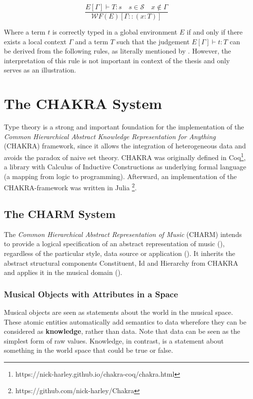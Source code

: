 \begin{equation}
\frac{E[\Gamma] \vdash T: s \quad s \in \mathcal{S} \quad x \notin \Gamma}{\mathcal{W} F(E)[\Gamma::(x: T)]}
\end{equation}



Where a term $t$ is correctly typed in a global environment $E$ if and only if there exists a local context $\Gamma$ and a term $T$ such that the judgement  $E[\Gamma] \vdash t:T$ can be derived from the following rules, as literally mentioned by \textcite{inria_calculus_2018}. However, the interpretation of this rule is not important in context of the thesis and only serves as an illustration.

 
\section{The CHAKRA System}

Type theory is a strong and important foundation for the implementation of the \textit{Common Hierarchical Abstract Knowledge Representation for Anything} (CHAKRA) framework, since it allows the integration of heterogeneous data and avoids the paradox of naive set theory. CHAKRA was originally defined in Coq\footnote{https://nick-harley.github.io/chakra-coq/chakra.html}, a library with Calculus of Inductive Constructions as underlying formal language (a mapping from logic to programming). Afterward, an implementation of the CHAKRA-framework was written in Julia \footnote{https://github.com/nick-harley/Chakra}.



\subsection{The CHARM System}
The \textit{Common Hierarchical Abstract Representation of Music} (CHARM) intends to provide a logical specification of an abstract representation of music
(\cite{pearce_construction_2005, wiggins_representing_1989}), regardless of the particular style, data source or application (\cite{smaill_hierarchical_1993}). It inherits the abstract structural components Constituent, Id and Hierarchy from CHAKRA and applies it in the musical domain (\cite{harley_charm_2022}). 


\subsubsection{Musical Objects with Attributes in a Space}
Musical objects are seen as statements about the world in the musical space. These atomic entities automatically add semantics to data wherefore they can be considered as \textbf{knowledge}, rather than data. Note that data can be seen as the simplest form of raw values. Knowledge, in contrast, is a statement about something in the world space that could be true or false.

